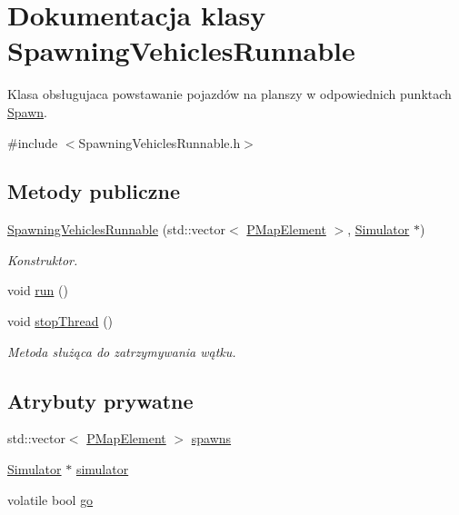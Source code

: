 \hypertarget{class_spawning_vehicles_runnable}{\section{Dokumentacja klasy Spawning\-Vehicles\-Runnable}
\label{class_spawning_vehicles_runnable}
}


Klasa obsługujaca powstawanie pojazdów na planszy w odpowiednich punktach \hyperlink{class_spawn}{Spawn}.  




{\ttfamily \#include $<$Spawning\-Vehicles\-Runnable.\-h$>$}

\subsection*{Metody publiczne}
\begin{DoxyCompactItemize}
\item 
\hyperlink{class_spawning_vehicles_runnable_a368400e286ab2536c4fd5a27251d8d2d}{Spawning\-Vehicles\-Runnable} (std\-::vector$<$ \hyperlink{_types_8h_a4260a5280323637f8a1fa28e89b6ef14}{P\-Map\-Element} $>$, \hyperlink{class_simulator}{Simulator} $\ast$)
\begin{DoxyCompactList}\small\item\em Konstruktor. \end{DoxyCompactList}\item 
void \hyperlink{class_spawning_vehicles_runnable_a3987c607c9c315ec9e66552d1cb0f799}{run} ()
\item 
void \hyperlink{class_spawning_vehicles_runnable_aa50e5fafaf1050a72658b0364c0bf88a}{stop\-Thread} ()
\begin{DoxyCompactList}\small\item\em Metoda służąca do zatrzymywania wątku. \end{DoxyCompactList}\end{DoxyCompactItemize}
\subsection*{Atrybuty prywatne}
\begin{DoxyCompactItemize}
\item 
std\-::vector$<$ \hyperlink{_types_8h_a4260a5280323637f8a1fa28e89b6ef14}{P\-Map\-Element} $>$ \hyperlink{class_spawning_vehicles_runnable_a1a9c575abd9e800d8b95a429b70be951}{spawns}
\item 
\hyperlink{class_simulator}{Simulator} $\ast$ \hyperlink{class_spawning_vehicles_runnable_a42bd4b9c441492b4206941856e140e3f}{simulator}
\item 
volatile bool \hyperlink{class_spawning_vehicles_runnable_ab868348a67a2995fc163b2155bfccb66}{go}
\end{DoxyCompactItemize}


